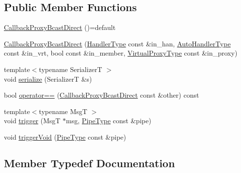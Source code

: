 \subsection*{Public Member Functions}
\begin{DoxyCompactItemize}
\item 
\hyperlink{structvt_1_1pipe_1_1callback_1_1_callback_proxy_bcast_direct_a4e1553252066be693d9471399a099d57}{Callback\+Proxy\+Bcast\+Direct} ()=default
\item 
\hyperlink{structvt_1_1pipe_1_1callback_1_1_callback_proxy_bcast_direct_a3249cc4b163da34218abb05efe207278}{Callback\+Proxy\+Bcast\+Direct} (\hyperlink{namespacevt_af64846b57dfcaf104da3ef6967917573}{Handler\+Type} const \&in\+\_\+han, \hyperlink{structvt_1_1pipe_1_1callback_1_1_callback_proxy_bcast_direct_a543cd86434430bd048952534f4fbc128}{Auto\+Handler\+Type} const \&in\+\_\+vrt, bool const \&in\+\_\+member, \hyperlink{namespacevt_a1b417dd5d684f045bb58a0ede70045ac}{Virtual\+Proxy\+Type} const \&in\+\_\+proxy)
\item 
{\footnotesize template$<$typename SerializerT $>$ }\\void \hyperlink{structvt_1_1pipe_1_1callback_1_1_callback_proxy_bcast_direct_aaa0cd50e42f5585d82425c703e0383b1}{serialize} (SerializerT \&s)
\item 
bool \hyperlink{structvt_1_1pipe_1_1callback_1_1_callback_proxy_bcast_direct_a47efba43a917e20ecdbaa513e502272b}{operator==} (\hyperlink{structvt_1_1pipe_1_1callback_1_1_callback_proxy_bcast_direct}{Callback\+Proxy\+Bcast\+Direct} const \&other) const
\item 
{\footnotesize template$<$typename MsgT $>$ }\\void \hyperlink{structvt_1_1pipe_1_1callback_1_1_callback_proxy_bcast_direct_a8d2fcd9c80915400e96c9094ba26c9d4}{trigger} (MsgT $\ast$msg, \hyperlink{namespacevt_ac9852acda74d1896f48f406cd72c7bd3}{Pipe\+Type} const \&pipe)
\item 
void \hyperlink{structvt_1_1pipe_1_1callback_1_1_callback_proxy_bcast_direct_aaa09586f609c545e3c0bff45dd5b6cbe}{trigger\+Void} (\hyperlink{namespacevt_ac9852acda74d1896f48f406cd72c7bd3}{Pipe\+Type} const \&pipe)
\end{DoxyCompactItemize}


\subsection{Member Typedef Documentation}
\mbox{\label{structvt_1_1pipe_1_1callback_1_1_callback_proxy_bcast_direct_a543cd86434430bd048952534f4fbc128}} 
